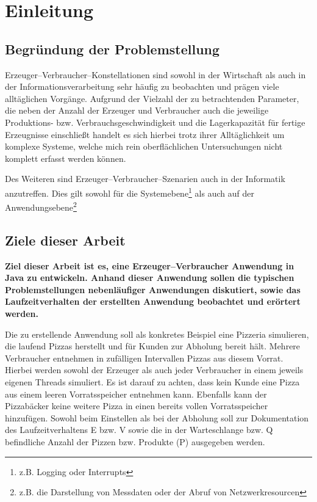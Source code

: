 \section{Einleitung} %
\label{sec:einleitung}

\subsection{Begründung der Problemstellung} %
\label{sub:begrundung_der_problemstellung}
Erzeuger–Verbraucher–Konstellationen sind sowohl in der Wirtschaft als auch in der Informationsverarbeitung sehr häufig zu beobachten und prägen viele alltäglichen Vorgänge. Aufgrund der Vielzahl der zu betrachtenden Parameter, die neben der Anzahl der Erzeuger und Verbraucher auch die jeweilige Produktions- bzw. Verbrauchsgeschwindigkeit und die Lagerkapazität für fertige Erzeugnisse einschließt handelt es sich hierbei trotz ihrer Alltäglichkeit um komplexe Systeme, welche mich rein oberflächlichen Untersuchungen nicht komplett erfasst werden können.

Des Weiteren sind Erzeuger–Verbraucher–Szenarien auch in der Informatik anzutreffen. Dies gilt sowohl für die Systemebene\footnote{z.B. Logging oder Interrupts} als auch auf der Anwendungsebene\footnote{z.B. die Darstellung von Messdaten oder der Abruf von Netzwerkresourcen}


\subsection{Ziele dieser Arbeit} %
\label{sub:ziele_dieser_arbeit}
\textbf{Ziel dieser Arbeit ist es, eine Erzeuger–Verbraucher Anwendung in Java zu entwickeln. Anhand dieser Anwendung sollen die typischen Problemstellungen nebenläufiger Anwendungen diskutiert, sowie das Laufzeitverhalten der erstellten Anwendung beobachtet und erörtert werden.}

Die zu erstellende Anwendung soll als konkretes Beispiel eine Pizzeria simulieren, die laufend Pizzas herstellt und für Kunden zur Abholung bereit hält. Mehrere Verbraucher entnehmen in zufälligen Intervallen Pizzas aus diesem Vorrat. Hierbei werden sowohl der Erzeuger als auch jeder Verbraucher in einem jeweils eigenen Threads simuliert.  Es ist darauf zu achten, dass kein Kunde eine Pizza aus einem leeren Vorratsspeicher entnehmen kann. Ebenfalls kann der Pizzabäcker keine weitere Pizza in einen bereits vollen Vorratsspeicher hinzufügen. Sowohl beim Einstellen als bei der Abholung soll zur Dokumentation des Laufzeitverhaltens \ac{E} bzw. \ac{V} sowie die in der Warteschlange bzw. \ac{Q} befindliche Anzahl der Pizzen bzw. Produkte (P) ausgegeben werden.

